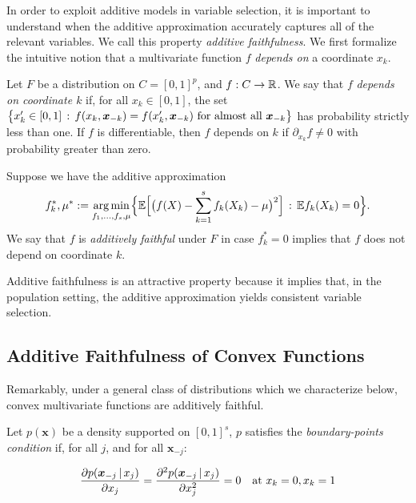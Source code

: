 In order to exploit additive models in variable selection, it is important to understand when the
additive approximation accurately captures all of the relevant variables.
We call this property \textit{additive faithfulness}. We first formalize the intuitive notion that a multivariate function $f$ \emph{depends on} a coordinate $x_k$.

\begin{definition}
  Let $F$ be a distribution on $C=[0,1]^p$, and $f:C \rightarrow {\mathbb R}$. 
We say that $f$ \textit{depends on coordinate $k$} if, for all $x_k \in [0,1]$, the set 
$\big\{ x'_k \in [0, 1] \,:\, f(x_k, \mbox{\boldmath $x$}_{-k}) = f(x'_k, \mbox{\boldmath $x$}_{-k}) 
\textrm{ for almost all  $\mbox{\boldmath $x$}_{-k}$} \big\}$ 
has probability strictly less than one.
If $f$ is differentiable, then $f$ depends on $k$ if $\partial_{x_k} f \neq 0$ with probability greater than zero.

Suppose we have the additive approximation
\begin{equation}
\label{eqn:unconstrained_additive}
f_k^*, \mu^* := \mathop{\text{\rm arg\,min}}_{f_1,\ldots, f_s, \mu} \Bigl\{ 
             {\mathbb E} \Bigl[\bigl( f(X) - \sum_{k=1}^s f_k(X_k) -\mu \bigr)^2 \Bigr]
         \,:\, {\mathbb E} f_k(X_k) = 0 \Bigr\}.
\end{equation}
We say that $f$ is \textit{additively faithful} under $F$ in case
$f^*_k = 0$ implies that $f$ does not depend on coordinate $k$.
\end{definition}


Additive faithfulness is an attractive property because it implies
that, in the population setting, the additive approximation yields
consistent variable selection.

\subsection{Additive Faithfulness of Convex Functions}

Remarkably, under a general class of distributions which we characterize below, convex multivariate functions are additively faithful.

\begin{definition}
\label{defn:boundary-point}
Let $p(\mathbf{x})$ be a density supported on $[0,1]^s$, $p$ satisfies the \emph{boundary-points condition} if, for all $j$, and for all $\mathbf{x}_{-j}$:

\[
\frac{\partial p(\mbox{\boldmath $x$}_{-j} {\,|\,} x_j)}{\partial x_j}  =  
\frac{\partial^2 p(\mbox{\boldmath $x$}_{-j} {\,|\,} x_j)}{\partial x_j^2} = 0
\quad \textrm{at } x_k = 0, x_k = 1
\]

\end{definition}



